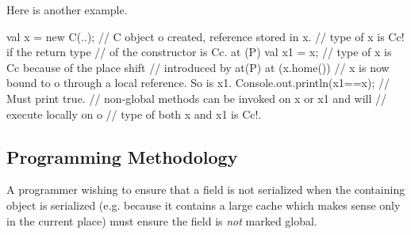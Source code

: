 Here is another example.
 \begin{xten}
val x = new C(..); 
// C object o created, reference stored in x. 
// type of x is C{c}! if the return type 
// of the constructor is C{c}. 
at (P) { 
    val x1 = x; 
    // type of x is C{c} because of the place shift 
    // introduced by at(P)
  at (x.home()) {
        // x is now bound to o through a local reference. So is x1.
    Console.out.println(x1==x); // Must print true.
      // non-global methods can be invoked on x or x1 and will 
      // execute locally on o
      // type of both x and x1 is C{c}!.
  }
}
\end{xten}
 
\subsection{Programming Methodology}

A programmer wishing to ensure that a  field is not serialized when
the containing object is serialized (e.g. because it contains a large
cache which makes sense only in the current place) must ensure the
field is \emph{not} marked global.


